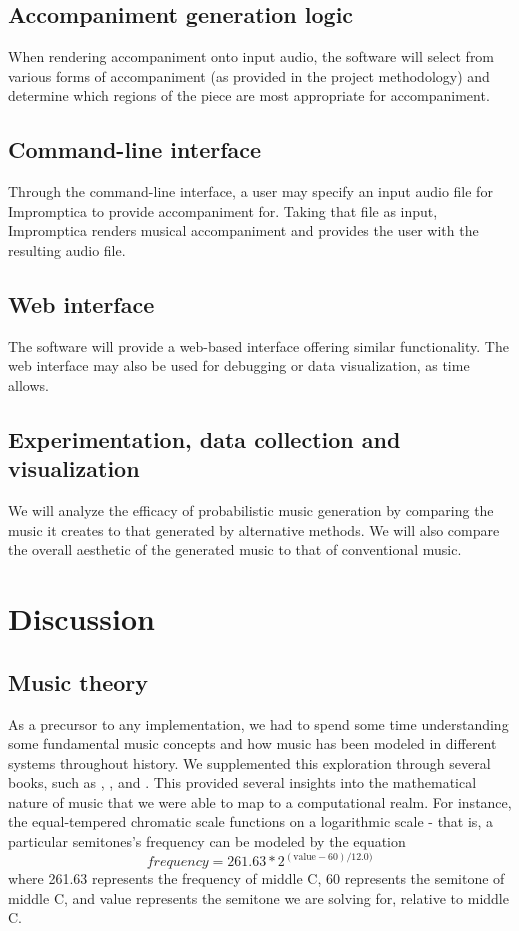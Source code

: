 \documentclass[11pt,conference,letterpaper]{IEEEtran}
\begin{document}
\subsection{Accompaniment generation logic}

When rendering accompaniment onto input audio, the software will select from various forms of accompaniment (as provided in the project methodology) and determine which regions of the piece are most appropriate for accompaniment.

\subsection{Command-line interface}

Through the command-line interface, a user may specify an input audio file for Impromptica to provide accompaniment for. Taking that file as input, Impromptica renders musical accompaniment and provides the user with the resulting audio file.

\subsection{Web interface}

The software will provide a web-based interface offering similar functionality. The web interface may also be used for debugging or data visualization, as time allows.

\subsection{Experimentation, data collection and visualization}

We will analyze the efficacy of probabilistic music generation by comparing the music it creates to that generated by alternative methods.  We will also compare the overall aesthetic of the generated music to that of conventional music.

\section{Discussion}

\subsection {Music theory}

As a precursor to any implementation, we had to spend some time understanding some fundamental music concepts and how music has been modeled in different systems throughout history. We supplemented this exploration through several books, such as \cite{temperly2007mprob}, \cite{krogerGeeksNerds}, and \cite{loy2006musimathics}. This provided several insights into the mathematical nature of music that we were able to map to a computational realm. For instance, the equal-tempered chromatic scale functions on a logarithmic scale - that is, a particular semitones's frequency can be modeled by the equation
{\small
	\[frequency = 261.63 * 2^{(\text{value} - 60) / 12.0)}\]
}
where 261.63 represents the frequency of middle C, 60 represents the semitone of middle C, and value represents the semitone we are solving for, relative to middle C.
\end{document}
